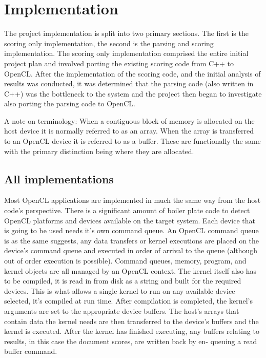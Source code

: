 \section{Implementation}

The project implementation is split into two primary sections. The first is the
scoring only implementation, the second is the parsing and scoring
implementation. The scoring only implementation comprised the entire initial
project plan and involved porting the existing scoring code from C++ to OpenCL.
After the implementation of the scoring code, and the initial analysis of
results was conducted, it was determined that the parsing code (also written in
C++) was the bottleneck to the system and the project then began to investigate
also porting the parsing code to OpenCL.

A note on terminology: When a contiguous block of memory is allocated on the
host device it is normally referred to as an array. When the array is
transferred to an OpenCL device it is referred to as a buffer. These are
functionally the same with the primary distinction being where they are
allocated.

\subsection{All implementations}

Most OpenCL applications are implemented in much the same way from the host
code's perspective. There is a significant amount of boiler plate code to detect
OpenCL platforms and devices available on the target system. Each device that is
going to be used needs it's own command queue. An OpenCL command queue is as the
same suggests, any data transfers or kernel executions are placed on the
device's command queue and executed in order of arrival to the queue (although
out of order execution is possible). Command queues, memory, program, and kernel
objects are all managed by an OpenCL context. The kernel itself also has to be
compiled, it is read in from disk as a string and built for the required
devices. This is what allows a single kernel to run on any available device
selected, it's compiled at run time. After compilation is completed, the
kernel's arguments are set to the appropriate device buffers. The host's arrays
that contain data the kernel needs are then transferred to the device's buffers
and the kernel is executed. After the kernel has finished executing, any buffers
relating to results, in this case the document scores, are written back by en-
queuing a read buffer command.

